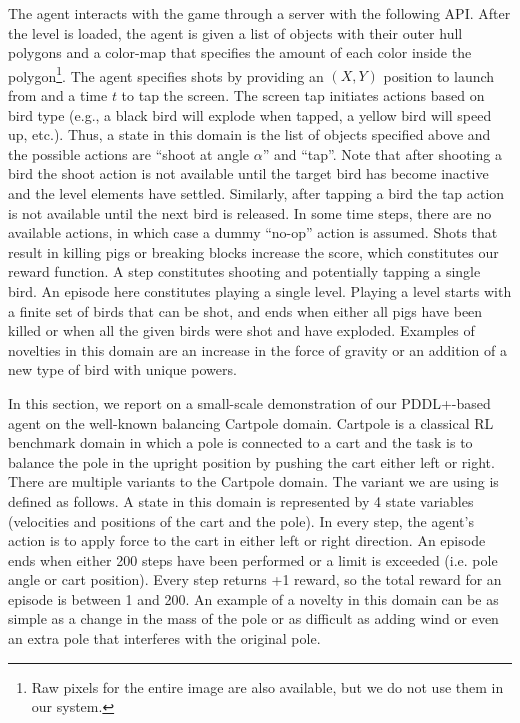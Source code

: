 The agent interacts with the game through a server with the following API. After the level is loaded, the agent is given a list of objects with their outer hull polygons and a color-map that specifies the amount of each color inside the polygon\footnote{Raw pixels for the entire image are also available, but we do not use them in our system.}. 
The agent specifies shots by providing an $(X, Y)$ position to launch from and a time $t$ to tap the screen. The screen tap initiates actions based on bird type (e.g., a black bird will explode when tapped, a yellow bird will speed up, etc.). 
Thus, a state in this domain is the list of objects specified above and the possible actions are ``shoot at angle $\alpha$'' and ``tap''. 
Note that after shooting a bird the shoot action is not available until the target bird has become inactive and the level elements have settled. 
Similarly, after tapping a bird the tap action is not available until the next bird is released. 
In some time steps, there are no available actions, in which case a dummy ``no-op'' action is assumed.  
Shots that result in killing pigs or breaking blocks increase the score, which constitutes our reward function. 
A step constitutes shooting and potentially tapping a single bird. 
An episode here constitutes playing a single level. 
Playing a level starts with a finite set of birds that can be shot, and ends when either all pigs have been killed or when all the given birds were shot and have exploded. 
Examples of novelties in this domain are an increase in the force of gravity or an addition of a new type of bird with unique powers. 




In this section, we report on a small-scale demonstration of our PDDL+-based \hydra agent on the well-known balancing Cartpole domain. Cartpole is a classical RL benchmark domain in which a pole is connected to a cart and the task is to balance the pole in the upright position by pushing the cart either left or right.
There are multiple variants to the Cartpole domain. The variant we are using is defined as follows.
A state in this domain is represented by 4 state variables (velocities and positions of the cart and the pole).
In every step, the agent's action is to apply force to the cart in either left or right direction. 
An episode ends when either 200 steps have been performed or a limit is exceeded (i.e. pole angle or cart position). %
Every step returns +1 reward, so the total reward for an episode is between 1 and 200. 
An example of a novelty in this domain can be as simple as a change in the mass of the pole or as difficult as adding wind or even an extra pole that interferes with the original pole. 
